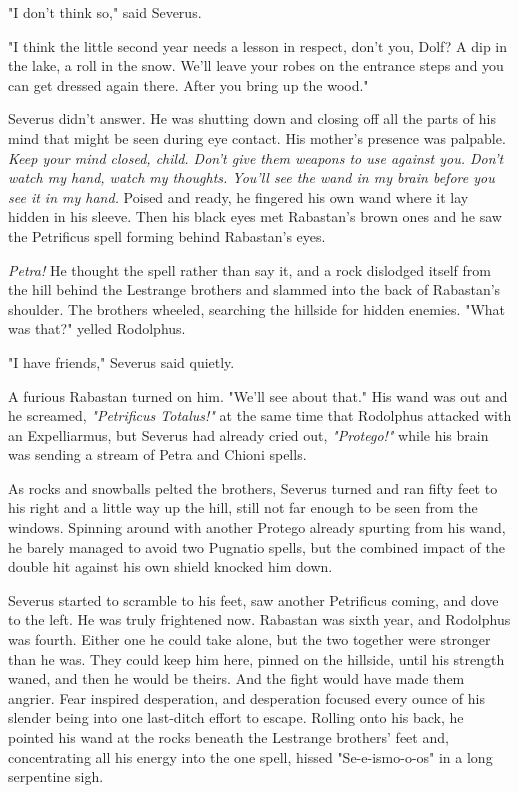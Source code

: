"I don't think so," said Severus.

"I think the little second year needs a lesson in respect, don't you, Dolf? A dip in the lake, a roll in the snow. We'll leave your robes on the entrance steps and you can get dressed again there. After you bring up the wood."

Severus didn't answer. He was shutting down and closing off all the parts of his mind that might be seen during eye contact. His mother's presence was palpable. \emph{Keep your mind closed, child. Don't give them weapons to use against you. Don't watch my hand, watch my thoughts. You'll see the wand in my brain before you see it in my hand.} Poised and ready, he fingered his own wand where it lay hidden in his sleeve. Then his black eyes met Rabastan's brown ones and he saw the Petrificus spell forming behind Rabastan's eyes.

\emph{Petra!} He thought the spell rather than say it, and a rock dislodged itself from the hill behind the Lestrange brothers and slammed into the back of Rabastan's shoulder. The brothers wheeled, searching the hillside for hidden enemies. "What was that?" yelled Rodolphus.

"I have friends," Severus said quietly.

A furious Rabastan turned on him. "We'll see about that." His wand was out and he screamed, \emph{"Petrificus Totalus!"} at the same time that Rodolphus attacked with an Expelliarmus, but Severus had already cried out, \emph{"Protego!"} while his brain was sending a stream of Petra and Chioni spells.

As rocks and snowballs pelted the brothers, Severus turned and ran fifty feet to his right and a little way up the hill, still not far enough to be seen from the windows. Spinning around with another Protego already spurting from his wand, he barely managed to avoid two Pugnatio spells, but the combined impact of the double hit against his own shield knocked him down.

Severus started to scramble to his feet, saw another Petrificus coming, and dove to the left. He was truly frightened now. Rabastan was sixth year, and Rodolphus was fourth. Either one he could take alone, but the two together were stronger than he was. They could keep him here, pinned on the hillside, until his strength waned, and then he would be theirs. And the fight would have made them angrier. Fear inspired desperation, and desperation focused every ounce of his slender being into one last-ditch effort to escape. Rolling onto his back, he pointed his wand at the rocks beneath the Lestrange brothers' feet and, concentrating all his energy into the one spell, hissed "Se-e-ismo-o-os" in a long serpentine sigh.

